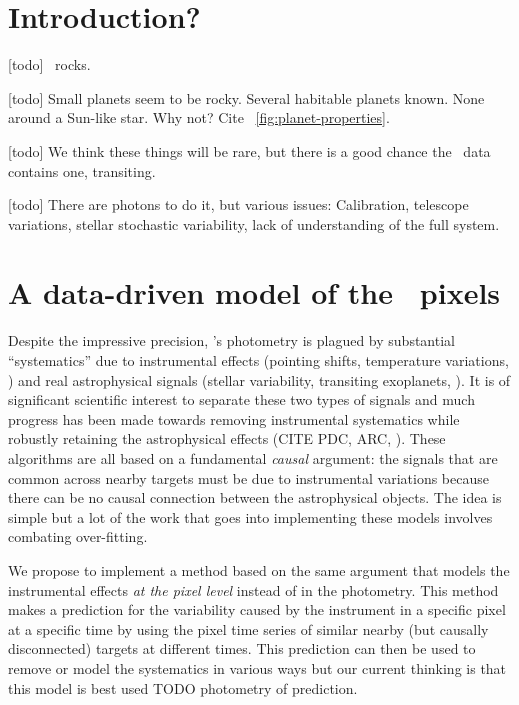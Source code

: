 \documentclass[letterpaper,12pt,preprint]{hack_aastex}
\begin{document}
\section{Introduction?}

[todo] \Kepler\ rocks.

[todo] Small planets seem to be rocky.  Several habitable planets known.  None around a Sun-like star.  Why not?  Cite \figurename~\ref{fig:planet-properties}.


[todo] We think these things will be rare, but there is a good chance the \Kepler\ data contains one, transiting.

[todo] There are photons to do it, but various issues:  Calibration, telescope variations, stellar stochastic variability, lack of understanding of the full system.

\section{A data-driven model of the \Kepler\ pixels}

Despite the impressive precision, \Kepler's photometry is plagued by
substantial ``systematics'' due to instrumental effects (pointing shifts,
temperature variations, \etc) and real astrophysical signals (stellar
variability, transiting exoplanets, \etc).
It is of significant scientific interest to separate these two types of
signals and much progress has been made towards removing instrumental
systematics while robustly retaining the astrophysical effects (CITE PDC, ARC,
\etc).
These algorithms are all based on a fundamental \emph{causal} argument: the
signals that are common across nearby targets must be due to instrumental
variations because there can be no causal connection between the astrophysical
objects.
The idea is simple but a lot of the work that goes into implementing these
models involves combating over-fitting.

We propose to implement a method based on the same argument that models the
instrumental effects \emph{at the pixel level} instead of in the photometry.
This method makes a prediction for the variability caused by the instrument in
a specific pixel at a specific time by using the pixel time series of similar
nearby (but causally disconnected) targets at different times.
This prediction can then be used to remove or model the systematics in various
ways but our current thinking is that this model is best used TODO photometry
of prediction.
\end{document}
